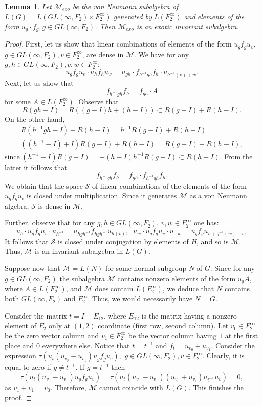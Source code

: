 \documentclass[11pt]{amsart}
\theoremstyle{plain}
\newtheorem{lemma}[theorem]{Lemma}
\theoremstyle{definition}
\theoremstyle{remark}
\numberwithin{equation}{section}
\begin{document}
\begin{lemma}\label{prop: extra subalgebra of L(H)}
Let $\mathcal M_{exo}$ be the von Neumann subalgebra of $L(G)=L(GL(\infty, F_2)\ltimes F_2^\infty)$ generated by $L( F_2^\infty)$ and elements of the form $u_g\cdot f_g,g\in GL(\infty,F_2)$. Then $\mathcal M_{exo}$ is an exotic invariant subalgebra.	
\end{lemma}
\begin{proof}
 First, let us show that linear combinations of elements of the form $u_g f_g u_v$, $g\in GL(\infty, F_2), v\in  F_2^\infty$, are dense in $\mathcal M$. We have for any $g,h\in GL(\infty,F_2),v,w\in F_2^\infty$:
$$u_gf_gu_v\cdot u_hf_hu_w=u_{gh}\cdot f_{h^{-1}gh}f_h\cdot u_{h^{-1}(v)+w}.$$ Next, let us show that \begin{equation}\label{equation: hfh multiplication}f_{h^{-1}gh}f_h=f_{gh}\cdot A\end{equation} for some $A\in L(F_2^\infty)$. Observe that $$R(gh-I)=R((g-I)h+(h-I))\subset R(g-I)+R(h-I).$$ On the other hand, \begin{align*}
	R(h^{-1}gh-I)+R(h-I)=h^{-1}R(g-I)+R(h-I)=\\ ((h^{-1}-I)+I)R(g-I)+R(h-I)=R(g-I)+R(h-I),\end{align*} since $(h^{-1}-I)R(g-I)=-(h-I)h^{-1}R(g-I)\subset R(h-I)$. From the latter it follows that $$f_{h^{-1}gh}f_h=%
    f_{gh}\cdot f_{h^{-1}gh}f_h.$$ 
    We obtain that the space $\mathcal S$ of linear combinations of the elements of the form $u_gf_gu_v$ is closed under multiplication. Since it generates $\mathcal M$ as a von Neumann algebra, $\mathcal S$ is dense in $\mathcal M$.

Further, observe that for any  $g,h\in GL(\infty, F_2)$, $v,w\in F_2^\infty$ one has:
$$u_h\cdot u_gf_gu_v\cdot u_{h^{-1}}=u_{hgh^{-1}}f_{hgh^{-1}} u_{h(v)},\;\;u_w\cdot u_gf_gu_v\cdot u_{-w} =u_gf_gu_{v+g^{-1}(w)-w}.$$ It follows that $\mathcal S$ is closed under conjugation by elements of $H$, and so is $\mathcal M$. Thus, $\mathcal M$ is an invariant subalgebra in $L(G)$.

Suppose now that $\mathcal M=L(N)$ for some normal subgroup $N$ of $G$. Since for any $g\in GL(\infty, F_2)$ the subalgebra $\mathcal M$ contains nonzero elements of the form $u_gA$, where $A\in L( F_2^\infty)$, and $\mathcal{M}$ does contain $L( F_2^\infty)$, we deduce that $N$ contains both $GL(\infty,F_2)$ and $F_2^\infty$. Thus, we would necessarily have $N=G$. 

Consider the matrix $t=I+E_{12}$, where $E_{12}$ is the matrix having a nonzero element of $ F_2$ only at $(1,2)$ coordinate (first row, second column). Let $v_0\in F_2^\infty$ be the zero vector column and $v_1\in F_2^\infty$ be the vector column having $1$ at the first place and $0$ everywhere else. Notice that $t = t^{-1}$ and $f_t=u_{v_0}+u_{v_1}$. Consider the expression $\tau(u_t(u_{v_0}-u_{v_1})u_gf_gu_v),$ $g\in GL(\infty, F_2),v\in F_2^\infty$. Clearly, it is equal to zero if $g\neq t^{-1}$. If $g=t^{-1}$ then  $$\tau(u_t(u_{v_0}-u_{v_1})u_gf_gu_v)=\tau(u_t(u_{v_0}-u_{v_1})(u_{v_0}+u_{v_1})u_{t^{-1}}u_v)=0,$$
as $v_1+v_1 = v_0$. Therefore, $\mathcal M$ cannot coincide with $L(G)$. This finishes the proof.
\end{proof}
\end{document}
